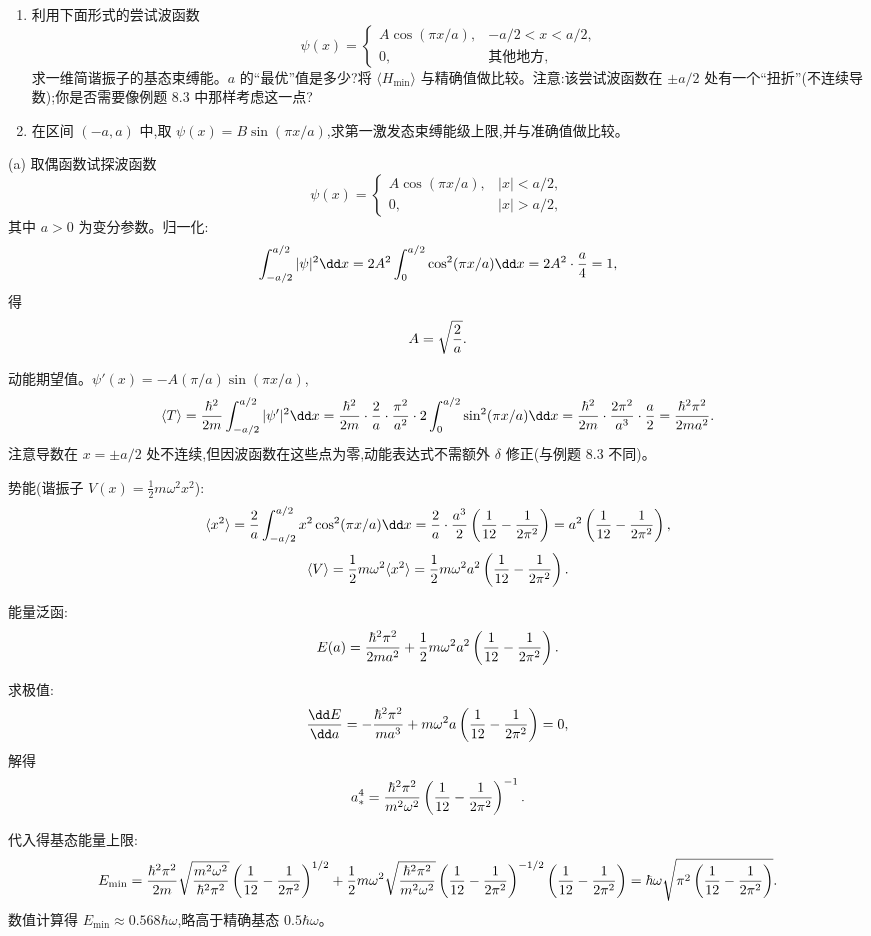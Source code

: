 \begin{question}
\begin{enumerate}
\item 利用下面形式的尝试波函数
\[
\psi(x)=\begin{cases} A\cos(\pi x/a), & -a/2<x<a/2,\\ 0, & \text{其他地方},\end{cases}
\]
求一维简谐振子的基态束缚能。$a$ 的“最优”值是多少?将 $\langle H_{\min}\rangle$ 与精确值做比较。注意:该尝试波函数在 $\pm a/2$ 处有一个“扭折”(不连续导数);你是否需要像例题 8.3 中那样考虑这一点?
\item 在区间 $(-a,a)$ 中,取 $\psi(x)=B\sin(\pi x/a)$,求第一激发态束缚能级上限,并与准确值做比较。
\end{enumerate}
\end{question}
\begin{solution}
(a) 取偶函数试探波函数
\[
\psi(x)=\begin{cases}
A\cos(\pi x/a), & |x|<a/2,\\
0, & |x|>a/2,
\end{cases}
\]
其中 $a>0$ 为变分参数。归一化:
\[
\int_{-a/2}^{a/2}|\psi|^2\dd x=2A^2\int_0^{a/2}\cos^2(\pi x/a)\dd x
=2A^2\cdot{a\over4}=1,
\]
得
\[
A=\sqrt{2\over a}.
\]

动能期望值。$\psi'(x)=-A(\pi/a)\sin(\pi x/a)$,
\[
\langle T\rangle={\hbar^2\over2m}\int_{-a/2}^{a/2}|\psi'|^2\dd x
={\hbar^2\over2m}\cdot{2\over a}\cdot{\pi^2\over a^2}\cdot2\int_0^{a/2}\sin^2(\pi x/a)\dd x
={\hbar^2\over2m}\cdot{2\pi^2\over a^3}\cdot{a\over2}
={\hbar^2\pi^2\over2ma^2}.
\]
注意导数在 $x=\pm a/2$ 处不连续,但因波函数在这些点为零,动能表达式不需额外 $\delta$ 修正(与例题 8.3 不同)。

势能(谐振子 $V(x)=\frac12m\omega^2x^2$):
\[
\langle x^2\rangle={2\over a}\int_{-a/2}^{a/2}x^2\cos^2(\pi x/a)\dd x
={2\over a}\cdot{a^3\over2}\left({1\over12}-{1\over2\pi^2}\right)
=a^2\left({1\over12}-{1\over2\pi^2}\right),
\]
\[
\langle V\rangle={1\over2}m\omega^2\langle x^2\rangle
={1\over2}m\omega^2a^2\left({1\over12}-{1\over2\pi^2}\right).
\]

能量泛函:
\[
E(a)={\hbar^2\pi^2\over2ma^2}+{1\over2}m\omega^2a^2\left({1\over12}-{1\over2\pi^2}\right).
\]

求极值:
\[
{\dd E\over\dd a}=-{\hbar^2\pi^2\over ma^3}+m\omega^2a\left({1\over12}-{1\over2\pi^2}\right)=0,
\]
解得
\[
a_*^4={\hbar^2\pi^2\over m^2\omega^2}\left({1\over12}-{1\over2\pi^2}\right)^{-1}.
\]

代入得基态能量上限:
\[
E_{\min}={\hbar^2\pi^2\over2m}\sqrt{m^2\omega^2\over\hbar^2\pi^2}\left({1\over12}-{1\over2\pi^2}\right)^{1/2}
+{1\over2}m\omega^2\sqrt{\hbar^2\pi^2\over m^2\omega^2}\left({1\over12}-{1\over2\pi^2}\right)^{-1/2}\left({1\over12}-{1\over2\pi^2}\right)
=\hbar\omega\sqrt{\pi^2\left({1\over12}-{1\over2\pi^2}\right)}.
\]
数值计算得 $E_{\min}\approx0.568\hbar\omega$,略高于精确基态 $0.5\hbar\omega$。


\end{solution}
